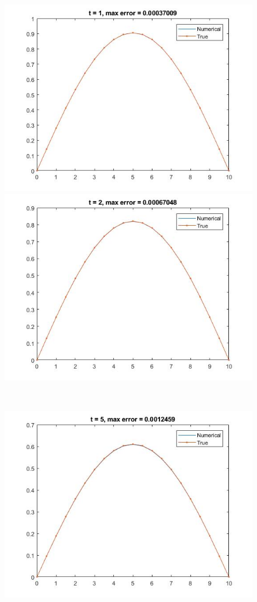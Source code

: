 \begin{figure}
\begin{minipage}{0.5\textwidth}
\includegraphics[width = \textwidth]{6.jpg}
\end{minipage}
\begin{minipage}{0.5\textwidth}
\includegraphics[width = \textwidth]{7.jpg}
\end{minipage} \\
\begin{minipage}{0.5\textwidth}
\includegraphics[width = \textwidth]{8.jpg}

\end{minipage}
\end{figure}
